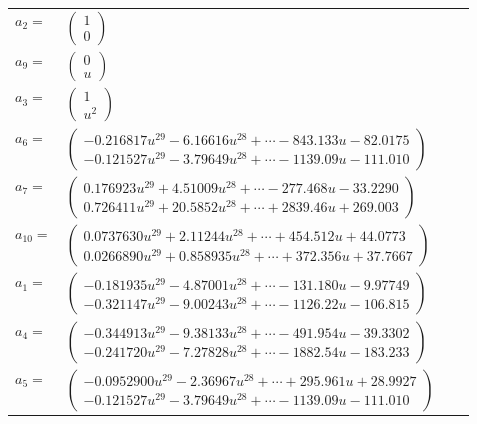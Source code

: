 \documentclass[1p]{elsarticle_modified}
\theoremstyle{definition}
\begin{document}
\begin{tabular}{m{7pt} m{180pt} m{7pt} m{180pt} }
\flushright $a_{2}=$&$\begin{pmatrix}1\\0\end{pmatrix}$ \\
\flushright $a_{9}=$&$\begin{pmatrix}0\\u\end{pmatrix}$ \\
\flushright $a_{3}=$&$\begin{pmatrix}1\\u^2\end{pmatrix}$ \\
\flushright $a_{6}=$&$\begin{pmatrix}-0.216817 u^{29}-6.16616 u^{28}+\cdots-843.133 u-82.0175\\-0.121527 u^{29}-3.79649 u^{28}+\cdots-1139.09 u-111.010\end{pmatrix}$ \\
\flushright $a_{7}=$&$\begin{pmatrix}0.176923 u^{29}+4.51009 u^{28}+\cdots-277.468 u-33.2290\\0.726411 u^{29}+20.5852 u^{28}+\cdots+2839.46 u+269.003\end{pmatrix}$ \\
\flushright $a_{10}=$&$\begin{pmatrix}0.0737630 u^{29}+2.11244 u^{28}+\cdots+454.512 u+44.0773\\0.0266890 u^{29}+0.858935 u^{28}+\cdots+372.356 u+37.7667\end{pmatrix}$ \\
\flushright $a_{1}=$&$\begin{pmatrix}-0.181935 u^{29}-4.87001 u^{28}+\cdots-131.180 u-9.97749\\-0.321147 u^{29}-9.00243 u^{28}+\cdots-1126.22 u-106.815\end{pmatrix}$ \\
\flushright $a_{4}=$&$\begin{pmatrix}-0.344913 u^{29}-9.38133 u^{28}+\cdots-491.954 u-39.3302\\-0.241720 u^{29}-7.27828 u^{28}+\cdots-1882.54 u-183.233\end{pmatrix}$ \\
\flushright $a_{5}=$&$\begin{pmatrix}-0.0952900 u^{29}-2.36967 u^{28}+\cdots+295.961 u+28.9927\\-0.121527 u^{29}-3.79649 u^{28}+\cdots-1139.09 u-111.010\end{pmatrix}$ \\

\end{tabular}
\end{document}
